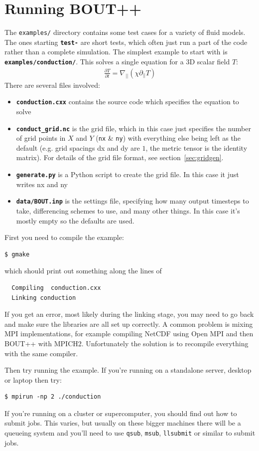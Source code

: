\documentclass[12pt]{article}
\newcommand{\code}[1]{\texttt{#1}}
\newcommand{\file}[1]{\texttt{\bf #1}}
\newcommand{\deriv}[2]{\ensuremath{\frac{\partial #1}{\partial #2}}}
\begin{document}
\section{Running BOUT++}
%
\label{sec:running}
%
The \texttt{examples/} directory contains some test cases for a variety of
fluid models. The ones starting \file{test-} are short tests, which often just
run a part of the code rather than a complete simulation.  The simplest example
to start with is \file{examples/conduction/}. This solves a single equation for
a 3D scalar field $T$:
%
\begin{align}
\deriv{T}{t} = \nabla_{||}\left(\chi\partial_{||} T\right)
\end{align}
%
There are several files involved:
%
\begin{itemize}
\item \file{conduction.cxx} contains the source code which specifies the
    equation to solve
\item \file{conduct\_grid.nc} is the grid file, which in this case just specifies the number
  of grid points in $X$ and $Y$ (\code{nx} \& \code{ny}) with everything else
    being left as the default (e.g. grid spacings dx and dy are $1$, the metric
    tensor is the identity matrix). For details of the grid file format, see
    section~\ref{sec:gridgen}.
\item \file{generate.py} is a Python script to create the grid file. In this case it just
  writes nx and ny
\item \file{data/BOUT.inp} is the settings file, specifying how many output timesteps to take,
  differencing schemes to use, and many other things. In this case it's mostly
  empty so the defaults are used.
\end{itemize}
%
First you need to compile the example:
%
\begin{verbatim}
$ gmake
\end{verbatim}
%
which should print out something along the lines of
%
\begin{verbatim}
  Compiling  conduction.cxx
  Linking conduction
\end{verbatim}
%
If you get an error, most likely during the linking stage, you may need to go
back and make sure the libraries are all set up correctly. A common problem is
mixing MPI implementations, for example compiling NetCDF using Open MPI and
then BOUT++ with MPICH2. Unfortunately the solution is to recompile everything
with the same compiler.

Then try running the example. If you're running on a standalone server, desktop
or laptop then try:
%
\begin{verbatim}
$ mpirun -np 2 ./conduction
\end{verbatim}
%
If you're running on a cluster or supercomputer, you should find out how to
submit jobs. This varies, but usually on these bigger machines there will be a
queueing system and you'll need to use \code{qsub}, \code{msub},
\code{llsubmit} or similar to submit jobs.
\end{document}

